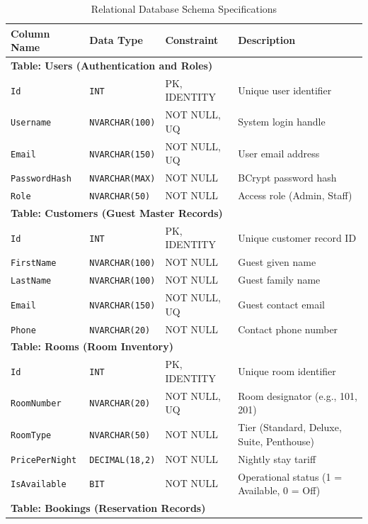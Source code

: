 \documentclass[11pt,a4paper]{article}
\begin{document}
\begin{table}[H]
\centering
\caption{Relational Database Schema Specifications}
\label{tab:db_schema}
\begin{tabularx}{\textwidth}{l l l X}
\toprule
\textbf{Column Name} & \textbf{Data Type} & \textbf{Constraint} & \textbf{Description} \\
\midrule
\multicolumn{4}{l}{\textbf{Table: Users (Authentication and Roles)}} \\
\texttt{Id} & \texttt{INT} & PK, IDENTITY & Unique user identifier \\
\texttt{Username} & \texttt{NVARCHAR(100)} & NOT NULL, UQ & System login handle \\
\texttt{Email} & \texttt{NVARCHAR(150)} & NOT NULL, UQ & User email address \\
\texttt{PasswordHash} & \texttt{NVARCHAR(MAX)} & NOT NULL & BCrypt password hash \\
\texttt{Role} & \texttt{NVARCHAR(50)} & NOT NULL & Access role (Admin, Staff) \\
\midrule
\multicolumn{4}{l}{\textbf{Table: Customers (Guest Master Records)}} \\
\texttt{Id} & \texttt{INT} & PK, IDENTITY & Unique customer record ID \\
\texttt{FirstName} & \texttt{NVARCHAR(100)} & NOT NULL & Guest given name \\
\texttt{LastName} & \texttt{NVARCHAR(100)} & NOT NULL & Guest family name \\
\texttt{Email} & \texttt{NVARCHAR(150)} & NOT NULL, UQ & Guest contact email \\
\texttt{Phone} & \texttt{NVARCHAR(20)} & NOT NULL & Contact phone number \\
\midrule
\multicolumn{4}{l}{\textbf{Table: Rooms (Room Inventory)}} \\
\texttt{Id} & \texttt{INT} & PK, IDENTITY & Unique room identifier \\
\texttt{RoomNumber} & \texttt{NVARCHAR(20)} & NOT NULL, UQ & Room designator (e.g., 101, 201) \\
\texttt{RoomType} & \texttt{NVARCHAR(50)} & NOT NULL & Tier (Standard, Deluxe, Suite, Penthouse) \\
\texttt{PricePerNight} & \texttt{DECIMAL(18,2)} & NOT NULL & Nightly stay tariff \\
\texttt{IsAvailable} & \texttt{BIT} & NOT NULL & Operational status (1 = Available, 0 = Off) \\
\midrule
\multicolumn{4}{l}{\textbf{Table: Bookings (Reservation Records)}} \\

\end{tabularx}
\end{table}
\end{document}
